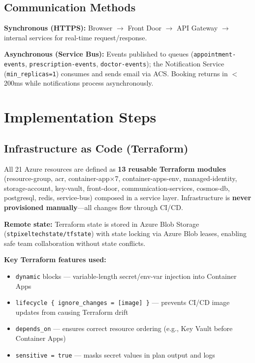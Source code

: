 \documentclass[12pt,a4paper]{article}
\begin{document}
\subsection{Communication Methods}

\textbf{Synchronous (HTTPS):} Browser $\to$ Front Door $\to$ API Gateway $\to$ internal services for real-time request/response.

\noindent\textbf{Asynchronous (Service Bus):} Events published to queues (\texttt{appointment-events}, \texttt{prescription-events}, \texttt{doctor-events}); the Notification Service (\texttt{min\_replicas=1}) consumes and sends email via ACS. Booking returns in $<$200ms while notifications process asynchronously.

\section{Implementation Steps}

\subsection{Infrastructure as Code (Terraform)}

All 21 Azure resources are defined as \textbf{13 reusable Terraform modules} (resource-group, acr, container-app$\times$7, container-apps-env, managed-identity, storage-account, key-vault, front-door, communication-services, cosmos-db, postgresql, redis, service-bus) composed in a service layer. Infrastructure is \textbf{never provisioned manually}---all changes flow through CI/CD.

\noindent\textbf{Remote state:} Terraform state is stored in Azure Blob Storage (\texttt{stpixeltechstate/tfstate}) with state locking via Azure Blob leases, enabling safe team collaboration without state conflicts.

\noindent\textbf{Key Terraform features used:}
\begin{itemize}[noitemsep,topsep=2pt]
    \item \texttt{dynamic} blocks --- variable-length secret/env-var injection into Container Apps
    \item \texttt{lifecycle \{ ignore\_changes = [image] \}} --- prevents CI/CD image updates from causing Terraform drift
    \item \texttt{depends\_on} --- ensures correct resource ordering (e.g., Key Vault before Container Apps)
    \item \texttt{sensitive = true} --- masks secret values in plan output and logs
\end{itemize}
\end{document}
